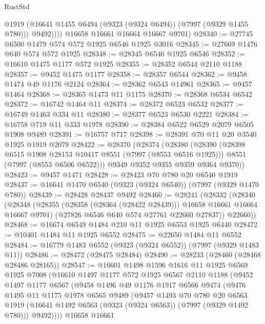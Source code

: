 \begin{lexlean}{RustStd}
\begin{coremodule}
              @1919
              (@16641 @1455 @6494 (@9323 (@9324 @6494)) (@7997 (@9329 @1455 @780)))
              @9492))))
      @16658
      @16661
      @16664
      @16667
      @9701)
@28340 := @27745 @6500 @1479 @574 @572 @1925 @6546 @1925 @3016
@28345 := @27669 @1476 @640 @574 @572 @1925
@28348 := @28345 @6546 @1925 @6546
@28352 := @16610 @1475 @1177 @572 @1925
@28355 := @28352 @6544 @2110 @1188
@28357 := @9452 @1475 @1177
@28358 := @28357 @6544
@28362 := @9458 @1474 @49 @1176 @2124
@28364 := @28362 @6543 @14961
@28365 := @9457 @1464
@28368 := @28365 @1473 @11 @1175
@28370 := @28368 @6534 @6542
@28372 := @16742 @1464 @11
@28374 := @28372 @6523 @6532
@28377 := @16749 @1463 @334 @11
@28380 := @28377 @6523 @6530 @2221
@28384 := @16758 @719 @11 @333 @1978
@28390 := @28384 @6522 @6529 @2079 @6505 @1908 @9489
@28391 := @16757 @717
@28398 := @28391 @70 @11 @20 @3540 @1925 @1919 @2079
@28422 := @28370
    (@28374
      (@28380
        (@28390
          (@28398 @6515 @1908 @28153 @10417 @8551 (@7997 (@8553 @6516 @1925)))
          @8551
          (@7997 (@8553 @6506 @6522)))
        @9349
        @9352
        @9355
        @9359
        @9364
        @9370))
@28423 := @9457 @1471
@28428 := @28423 @70 @780 @20 @6540 @1919
@28437 := @16641 @1470 @6540 (@9323 (@9324 @6540)) (@7997 (@9329 @1470 @780))
@28439 := @28428 @28437 @9492
@28460 := @28241
    (@28332
      (@28340
        (@28348
          (@28355 (@28358 (@28364 (@28422 @28439))) @16658 @16661 @16664 @16667 @9701)
          (@27826 @6546 @640 @574 @27761 @22660 @27837))
        @22660))
@28468 := @16674 @6549 @1484 @210 @11 @1925 @6553 @1925 @6440
@28472 := @10401 @1484 @11 @1925 @6552
@28475 := @22650 @1484 @11 @6552
@28484 := @16779 @1483 @6552 (@9323 (@9324 @6552)) (@7997 (@9329 @1483 @11))
@28486 := @28472 (@28475 @28484)
@28490 := @28233 (@28460 (@28468 @28486 @28165))
@28547 := @16601
    @1498
    @1596
    @1616
    @11
    @1925
    @6569
    @1925
    @7008
    (@16610
      @1497
      @1177
      @572
      @1925
      @6567
      @2110
      @1188
      (@9452
        @1497
        @1177
        @6567
        (@9458
          @1496
          @49
          @1176
          @1917
          @6566
          @9474
          (@9476
            @1495
            @11
            @1175
            @1978
            @6565
            @9489
            (@9457
              @1493
              @70
              @780
              @20
              @6563
              @1919
              (@16641 @1492 @6563 (@9323 (@9324 @6563)) (@7997 (@9329 @1492 @780)))
              @9492))))
      @16658
      @16661

\end{coremodule}
\end{lexlean}
